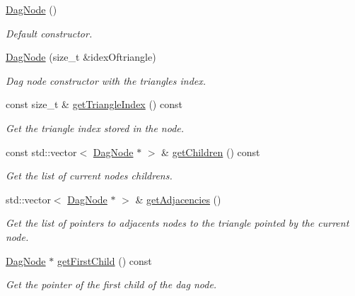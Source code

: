 \begin{DoxyCompactItemize}
\item 
\mbox{\label{classDagNode_a4ed19a5e9d5ada51128fcc181f9830ae}} 
\hyperlink{classDagNode_a4ed19a5e9d5ada51128fcc181f9830ae}{Dag\+Node} ()
\begin{DoxyCompactList}\small\item\em Default constructor. \end{DoxyCompactList}\item 
\hyperlink{classDagNode_ad44cf14086cd653ba9ede6762da32e83}{Dag\+Node} (size\+\_\+t \&idex\+Oftriangle)
\begin{DoxyCompactList}\small\item\em Dag node constructor with the triangle\textquotesingle{}s index. \end{DoxyCompactList}\item 
const size\+\_\+t \& \hyperlink{classDagNode_a5ff9ecbb6e1a5008c5b833afc8f08bab}{get\+Triangle\+Index} () const
\begin{DoxyCompactList}\small\item\em Get the triangle index stored in the node. \end{DoxyCompactList}\item 
const std\+::vector$<$ \hyperlink{classDagNode}{Dag\+Node} $\ast$ $>$ \& \hyperlink{classDagNode_a3d0c86f01088ead2007a1c64c1dddf77}{get\+Children} () const
\begin{DoxyCompactList}\small\item\em Get the list of current node\textquotesingle{}s childrens. \end{DoxyCompactList}\item 
std\+::vector$<$ \hyperlink{classDagNode}{Dag\+Node} $\ast$ $>$ \& \hyperlink{classDagNode_abc1bd7d5b2a39d85cd7bd924cdc984b3}{get\+Adjacencies} ()
\begin{DoxyCompactList}\small\item\em Get the list of pointers to adjacents nodes to the triangle pointed by the current node. \end{DoxyCompactList}\item 
\hyperlink{classDagNode}{Dag\+Node} $\ast$ \hyperlink{classDagNode_a35869cdb3ff3900d2ed4366270a39b83}{get\+First\+Child} () const
\begin{DoxyCompactList}\small\item\em Get the pointer of the first child of the dag node. \end{DoxyCompactList}\item 

\end{DoxyCompactItemize}
